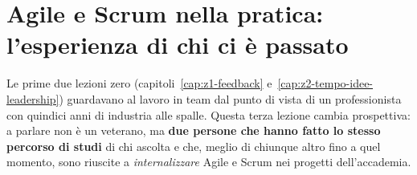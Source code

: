 %
%
%    
%    
%    
%    
%

\chapter[Agile e Scrum nella pratica]{Agile e Scrum nella pratica: l'esperienza di chi ci è passato}
\label{cap:z3-agile-scrum}

Le prime due lezioni zero (capitoli~\ref{cap:z1-feedback}
e~\ref{cap:z2-tempo-idee-leadership}) guardavano al lavoro in team dal punto
di vista di un professionista con quindici anni di industria alle spalle.
Questa terza lezione cambia prospettiva: a parlare non è un veterano, ma
\textbf{due persone che hanno fatto lo stesso percorso di studi} di chi
ascolta e che, meglio di chiunque altro fino a quel momento, sono riuscite a
\emph{internalizzare} Agile e Scrum nei progetti dell'accademia.

